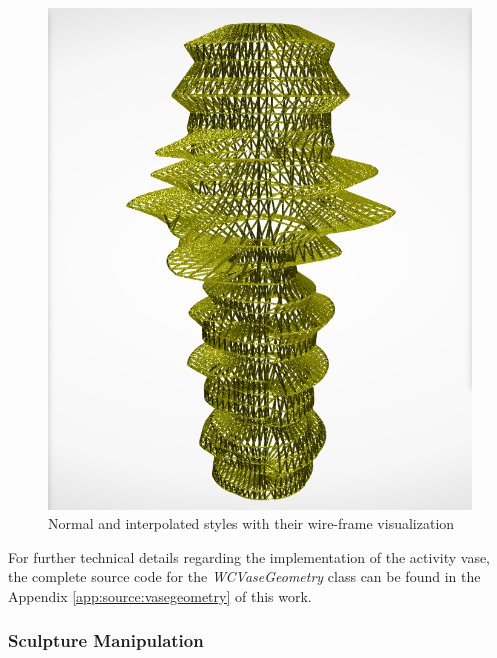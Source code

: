 \documentclass[../medieninformatik-arbeit.tex]{subfiles}
\begin{document}
\begin{figure}[t!]
\begin{minipage}{.225\textwidth}
\end{minipage}
\begin{minipage}{.225\textwidth}
\centering
  \includegraphics[width=\linewidth]{Configurator/img/sculpture-2w}
\end{minipage}
\caption{\protect Normal and interpolated styles with their wire-frame visualization}
\label{fig:sculpture styles}
\end{figure}

For further technical details regarding the implementation of the activity vase, the complete source code for the \textit{WCVaseGeometry} class can be found in the Appendix \ref{app:source:vasegeometry} of this work.

\subsubsection{Sculpture Manipulation}
\label{sub:sculpturegeneration}
\end{document}
